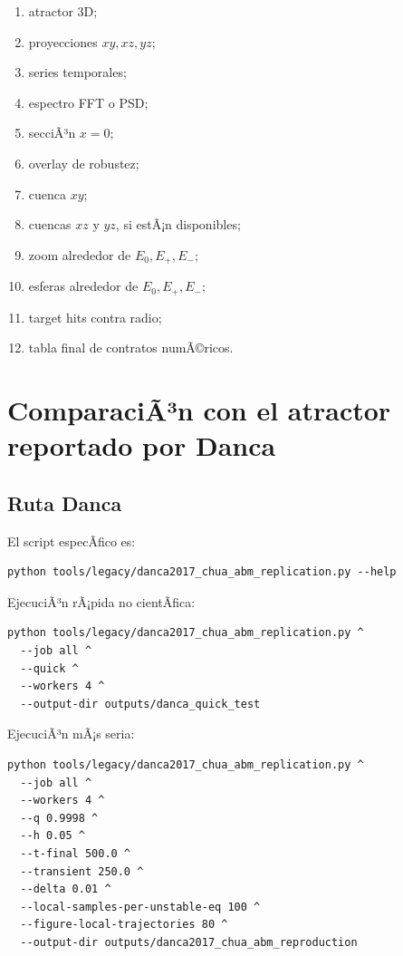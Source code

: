\documentclass[11pt]{article}
\begin{document}
\begin{enumerate}
\item atractor 3D;
\item proyecciones \(xy,xz,yz\);
\item series temporales;
\item espectro FFT o PSD;
\item secciÃ³n \(x=0\);
\item overlay de robustez;
\item cuenca \(xy\);
\item cuencas \(xz\) y \(yz\), si estÃ¡n disponibles;
\item zoom alrededor de \(E_0,E_+,E_-\);
\item esferas alrededor de \(E_0,E_+,E_-\);
\item target hits contra radio;
\item tabla final de contratos numÃ©ricos.
\end{enumerate}

\section{ComparaciÃ³n con el atractor reportado por Danca}

\subsection{Ruta Danca}

El script especÃ­fico es:

\begin{lstlisting}
python tools/legacy/danca2017_chua_abm_replication.py --help
\end{lstlisting}

EjecuciÃ³n rÃ¡pida no cientÃ­fica:

\begin{lstlisting}
python tools/legacy/danca2017_chua_abm_replication.py ^
  --job all ^
  --quick ^
  --workers 4 ^
  --output-dir outputs/danca_quick_test
\end{lstlisting}

EjecuciÃ³n mÃ¡s seria:

\begin{lstlisting}
python tools/legacy/danca2017_chua_abm_replication.py ^
  --job all ^
  --workers 4 ^
  --q 0.9998 ^
  --h 0.05 ^
  --t-final 500.0 ^
  --transient 250.0 ^
  --delta 0.01 ^
  --local-samples-per-unstable-eq 100 ^
  --figure-local-trajectories 80 ^
  --output-dir outputs/danca2017_chua_abm_reproduction
\end{lstlisting}
\end{document}
